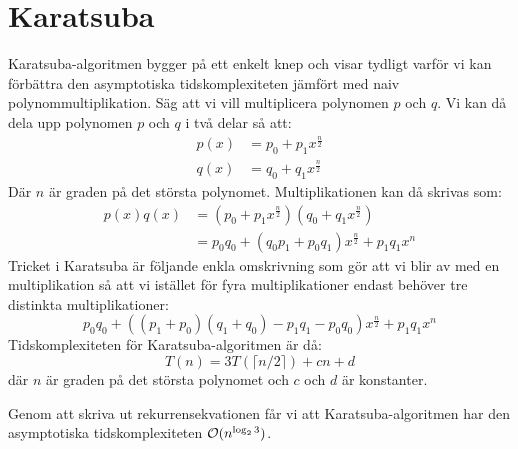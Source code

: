 \section{Karatsuba}
\label{sec:karatsuba}
Karatsuba-algoritmen bygger på ett enkelt knep och visar tydligt varför vi kan
förbättra den asymptotiska tidskomplexiteten jämfört med naiv
polynommultiplikation. Säg att vi vill multiplicera polynomen $p$ och $q$. Vi
kan då dela upp polynomen $p$ och $q$ i två delar så att:
\begin{align*}
  p(x) &= p_0 + p_1 x^{\frac{n}{2}} \\
  q(x) &= q_0 + q_1 x^{\frac{n}{2}}
\end{align*}
Där $n$ är graden på det största polynomet. Multiplikationen kan då skrivas
som:
\begin{align*}
p(x)q(x) &= (p_0 + p_1 x^{\frac{n}{2}})(q_0 + q_1 x^{\frac{n}{2}}) \\
         &= p_0 q_0  + (q_0 p_1 +p_0 q_1 )  x^{\frac{n}{2}} + p_1 q_1  x^n
\end{align*}
Tricket i Karatsuba är följande enkla omskrivning som gör att vi blir av med en
multiplikation så att vi istället för fyra multiplikationer endast behöver tre
distinkta multiplikationer:
\begin{equation*}
  p_0 q_0 + ((p_1 + p_0)(q_1 + q_0) - p_1 q_1 - p_0 q_0)  x^{\frac{n}{2}} + p_1 q_1  x^n
\end{equation*}
Tidskomplexiteten för Karatsuba-algoritmen är då:
\begin{equation*}
  T(n) = 3 T(\lceil n/2\rceil) + cn + d
\end{equation*}
där $n$ är graden på det största polynomet och $c$ och $d$ är konstanter.

Genom att skriva ut rekurrensekvationen får vi att Karatsuba-algoritmen har den
asymptotiska tidskomplexiteten $\mathcal{O}(n^{\log_2 3})$.
